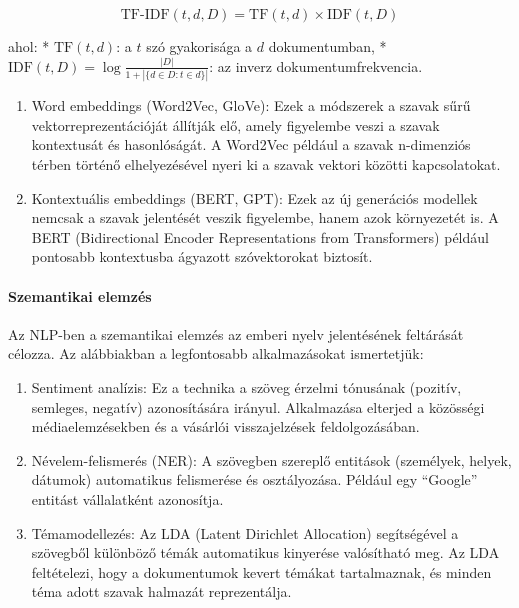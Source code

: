 \documentclass[11pt]{article}
\begin{document}
\[\text{TF-IDF}(t, d, D) = \text{TF}(t, d) \times \text{IDF}(t, D)\]

ahol: * \(\text{TF}(t, d)\): a \(t\) szó gyakorisága a \(d\)
dokumentumban, *
\(\text{IDF}(t, D) = \log \frac{|D|}{1 + |\{d \in D : t \in d\}|}\): az
inverz dokumentumfrekvencia.

\begin{enumerate}
\def\labelenumi{\arabic{enumi}.}
\setcounter{enumi}{2}
\item
  Word embeddings (Word2Vec, GloVe): Ezek a módszerek a szavak sűrű
  vektorreprezentációját állítják elő, amely figyelembe veszi a szavak
  kontextusát és hasonlóságát. A Word2Vec például a szavak n-dimenziós
  térben történő elhelyezésével nyeri ki a szavak vektori közötti
  kapcsolatokat.
\item
  Kontextuális embeddings (BERT, GPT): Ezek az új generációs modellek
  nemcsak a szavak jelentését veszik figyelembe, hanem azok környezetét
  is. A BERT (Bidirectional Encoder Representations from Transformers)
  például pontosabb kontextusba ágyazott szóvektorokat biztosít.
\end{enumerate}

\paragraph{Szemantikai elemzés}\label{szemantikai-elemzuxe9s}

Az NLP-ben a szemantikai elemzés az emberi nyelv jelentésének feltárását
célozza. Az alábbiakban a legfontosabb alkalmazásokat ismertetjük:

\begin{enumerate}
\def\labelenumi{\arabic{enumi}.}
\item
  Sentiment analízis: Ez a technika a szöveg érzelmi tónusának (pozitív,
  semleges, negatív) azonosítására irányul. Alkalmazása elterjed a
  közösségi médiaelemzésekben és a vásárlói visszajelzések
  feldolgozásában.
\item
  Névelem-felismerés (NER): A szövegben szereplő entitások (személyek,
  helyek, dátumok) automatikus felismerése és osztályozása. Például egy
  ``Google'' entitást vállalatként azonosítja.
\item
  Témamodellezés: Az LDA (Latent Dirichlet Allocation) segítségével a
  szövegből különböző témák automatikus kinyerése valósítható meg. Az
  LDA feltételezi, hogy a dokumentumok kevert témákat tartalmaznak, és
  minden téma adott szavak halmazát reprezentálja.
\end{enumerate}
\end{document}
